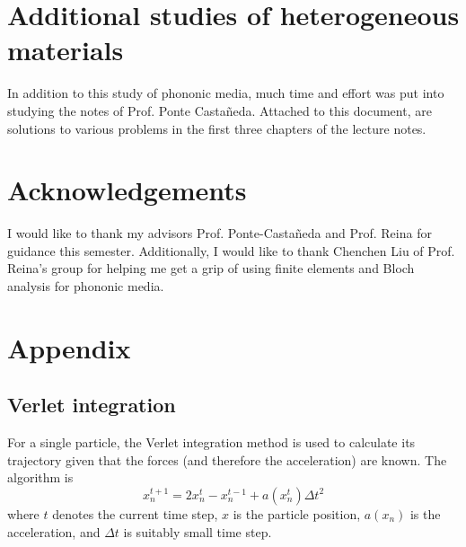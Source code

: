 \documentclass{article}
\begin{document}
\section{Additional studies of heterogeneous materials}
In addition to this study of phononic media, much time and effort was put into 
studying the notes of Prof. Ponte Casta\~neda. Attached to this document, are 
solutions to various problems in the first three chapters of the lecture notes. 

\section{Acknowledgements}
I would like to thank my advisors Prof. Ponte-Casta\~neda and Prof. Reina for
guidance this semester. Additionally, I would like to thank Chenchen Liu of
Prof. Reina's group for helping me get a grip of using finite elements and Bloch
analysis for phononic media.

\appendix
\section{Appendix}
\subsection{Verlet integration} \label{verlet}
For a single particle, the Verlet integration method is used to calculate its 
trajectory given that the forces (and therefore the acceleration) are known. 
The algorithm is
\begin{equation}
x^{t+1}_{n} = 2x^{t}_{n} - x^{t-1}_{n} + a(x^{t}_n)\Delta t^2
\end{equation}
where $t$ denotes the current time step, $x$ is the particle position, $a(x_n)$ 
is the acceleration, and $\Delta t$ is suitably small time step. 
\end{document}
